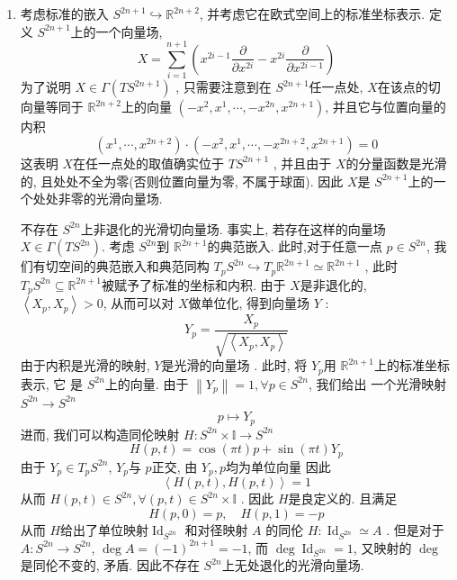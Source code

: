 \documentclass[../main.tex]{subfiles}
\begin{document}
\begin{solution}
    \begin{enumerate}
        \item[a).] 考虑标准的嵌入 \(  S^{2n+ 1}\hookrightarrow \mathbb{R} ^{2n+ 2}  \), 并考虑它在欧式空间上的标准坐标表示. 定义 \(  S^{2n+ 1}  \)上的一个向量场, \[
        X= \sum _{i= 1}^{n+ 1}\left(  x^{2i-1}  \frac{\partial }{\partial x^{2i}}-x^{2i} \frac{\partial }{\partial x^{2i-1}} \right) 
        \]  为了说明 \(  X \in  \Gamma \left(T S^{2n+ 1} \right)   \) , 只需要注意到在 \(  S^{2n+ 1}  \)任一点处, \(  X  \)在该点的切向量等同于 \(  \mathbb{R} ^{2n+ 2}  \)上的向量 \(  \left( -x^{2},x^{1},\cdots ,-x^{2n},x^{2n+ 1} \right)   \), 并且它与位置向量的内积     \[
        \left( x^{1},\cdots ,x^{2n+ 2} \right)\cdot  \left(- x^{2},x^{1},\cdots ,- x^{2n+ 2}, x^{2n+ 1} \right)  = 0
        \]这表明 \(  X  \)在任一点处的取值确实位于 \(  TS^{2n+ 1}  \)  ,  并且由于 \(  X  \)的分量函数是光滑的, 且处处不全为零(否则位置向量为零, 不属于球面). 因此 \(  X  \)是 \(  S^{2n+ 1}  \)上的一个处处非零的光滑向量场.   



        不存在 \(  S^{2n}  \)上非退化的光滑切向量场. 事实上, 若存在这样的向量场 \(  X  \in  \Gamma \left( TS^{2n} \right) \). 考虑 \(  S^{2n}  \)到 \(  \mathbb{R} ^{2n+ 1}  \)的典范嵌入. 此时,对于任意一点 \(  p\in  S^{2n} \), 我们有切空间的典范嵌入和典范同构 \(  T_{p}S^{2n}\hookrightarrow T_{p}\mathbb{R} ^{2n+ 1}\simeq \mathbb{R} ^{2n+ 1}  \) ,  此时 \(  T_{p}S^{2n}\subseteq \mathbb{R} ^{2n+ 1}  \)被赋予了标准的坐标和内积. 由于 \(  X  \)是非退化的,  \(  \left<X_{p},X_{p} \right>> 0  \), 从而可以对 \(  X  \)做单位化, 得到向量场 \(  Y  \) :     \[
        Y_{p}= \frac{X_{p} }{\sqrt{\left<X_{p}, X_{p} \right>} } 
        \]由于内积是光滑的映射, \(  Y  \)是光滑的向量场 . 此时, 将 \(  Y_{p}  \)用 \(  \mathbb{R} ^{2n+ 1}  \)上的标准坐标表示, 它   是 \(  S^{2n}  \)上的向量. 由于 \(  \left\| Y_{p} \right\|= 1, \forall p \in S^{2n}  \), 我们给出 一个光滑映射\(  S^{2n}\to S^{2n}  \) \[
        p\mapsto  Y_{p}
        \]  进而, 我们可以构造同伦映射 \(  H: S^{2n}\times \mathbb{I}\to S^{2n}  \) \[
        H\left( p,t \right)=  \cos  \left(  \pi t \right) p   + \sin \left(  \pi t \right)  Y_{p} 
        \] 由于 \(  Y_{p}\in T_{p}S^{2n}  \), \(  Y_{p}  \)与 \(  p  \)正交, 由 \(  Y_{p},p  \)均为单位向量  因此    \[
        \left<H\left( p,t \right),H\left( p,t \right)   \right>= 1
        \]从而 \(  H\left( p,t \right) \in S^{2n}, \forall \left( p,t \right)\in S^{2n}\times \mathbb{I}    \) . 因此 \(  H  \)是良定义的. 且满足 \[
        H\left( p,0 \right)= p,\quad H\left( p,1 \right)= -p  
        \] 从而 \(  H  \)给出了单位映射\(  \operatorname{Id}_{S^{2n}}  \) 和对径映射 \(  A  \) 的同伦 \(  H: \operatorname{Id}_{S^{2n}}\simeq  A \)  . 但是对于 \(  A: S^{2n}\to S^{2n}  \),   \(  \operatorname{deg}A  = \left( -1 \right)^{2n+ 1}= -1 \), 而 \(  \operatorname{deg} \operatorname{Id}_{S^{2n}}= 1  \), 又映射的 \(  \operatorname{deg}  \)是同伦不变的, 矛盾. 因此不存在 \(  S^{2n}  \)上无处退化的光滑向量场.  


\end{enumerate}
\end{solution}
\end{document}
